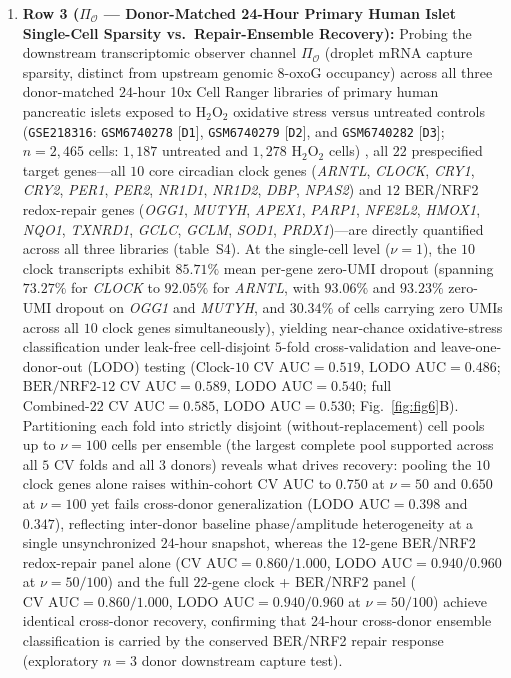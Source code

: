 \documentclass[10pt,letterpaper]{article}
\theoremstyle{plain}
\theoremstyle{definition}
\newcommand{\oxog}{\text{8-oxoG}}
\begin{document}
\begin{enumerate}[leftmargin=1.8em,itemsep=2pt]
    \item \textbf{Row 3 ($\Pi_{\mathcal{O}}$ --- Donor-Matched 24-Hour Primary Human Islet Single-Cell Sparsity vs.\ Repair-Ensemble Recovery):} Probing the downstream transcriptomic observer channel $\Pi_{\mathcal{O}}$ (droplet mRNA capture sparsity, distinct from upstream genomic $\oxog$ occupancy) across all three donor-matched $24$-hour 10x Cell Ranger libraries of primary human pancreatic islets exposed to $\mathrm{H_2O_2}$ oxidative stress versus untreated controls (\texttt{GSE218316}: \texttt{GSM6740278} [\texttt{D1}], \texttt{GSM6740279} [\texttt{D2}], and \texttt{GSM6740282} [\texttt{D3}]; $n = 2{,}465$ cells: $1{,}187$ untreated and $1{,}278$ $\mathrm{H_2O_2}$ cells) \cite{thomaidou2023diabetologia}, all $22$ prespecified target genes---all $10$ core circadian clock genes (\emph{ARNTL}, \emph{CLOCK}, \emph{CRY1}, \emph{CRY2}, \emph{PER1}, \emph{PER2}, \emph{NR1D1}, \emph{NR1D2}, \emph{DBP}, \emph{NPAS2}) and $12$ BER/NRF2 redox-repair genes (\emph{OGG1}, \emph{MUTYH}, \emph{APEX1}, \emph{PARP1}, \emph{NFE2L2}, \emph{HMOX1}, \emph{NQO1}, \emph{TXNRD1}, \emph{GCLC}, \emph{GCLM}, \emph{SOD1}, \emph{PRDX1})---are directly quantified across all three libraries (table~S4). At the single-cell level ($\nu = 1$), the $10$ clock transcripts exhibit $85.71\%$ mean per-gene zero-UMI dropout (spanning $73.27\%$ for \emph{CLOCK} to $92.05\%$ for \emph{ARNTL}, with $93.06\%$ and $93.23\%$ zero-UMI dropout on \emph{OGG1} and \emph{MUTYH}, and $30.34\%$ of cells carrying zero UMIs across all $10$ clock genes simultaneously), yielding near-chance oxidative-stress classification under leak-free cell-disjoint $5$-fold cross-validation and leave-one-donor-out ($\mathrm{LODO}$) testing ($\text{Clock-10 CV AUC} = 0.519$, $\text{LODO AUC} = 0.486$; $\text{BER/NRF2-12 CV AUC} = 0.589$, $\text{LODO AUC} = 0.540$; full $\text{Combined-22 CV AUC} = 0.585$, $\text{LODO AUC} = 0.530$; Fig.~\ref{fig:fig6}B). Partitioning each fold into strictly disjoint (without-replacement) cell pools up to $\nu = 100$ cells per ensemble (the largest complete pool supported across all $5$ CV folds and all $3$ donors) reveals what drives recovery: pooling the $10$ clock genes alone raises within-cohort CV $\mathrm{AUC}$ to $0.750$ at $\nu = 50$ and $0.650$ at $\nu = 100$ yet fails cross-donor generalization ($\text{LODO AUC} = 0.398$ and $0.347$), reflecting inter-donor baseline phase/amplitude heterogeneity at a single unsynchronized $24$-hour snapshot, whereas the $12$-gene BER/NRF2 redox-repair panel alone ($\text{CV AUC} = 0.860 / 1.000$, $\text{LODO AUC} = 0.940 / 0.960$ at $\nu = 50 / 100$) and the full $22$-gene clock + BER/NRF2 panel ($\text{CV AUC} = 0.860 / 1.000$, $\text{LODO AUC} = 0.940 / 0.960$ at $\nu = 50 / 100$) achieve identical cross-donor recovery, confirming that 24-hour cross-donor ensemble classification is carried by the conserved BER/NRF2 repair response (exploratory $n = 3$ donor downstream capture test).

\end{enumerate}
\end{document}
